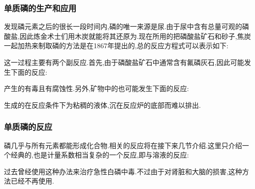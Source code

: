\documentclass{ctexart}
\begin{document}
\subsubsection{单质磷的生产和应用}
发现磷元素之后的很长一段时间内,磷的唯一来源是尿.由于尿中含有总量可观的磷酸盐,因此炼金术士们用木炭就能将其还原为.现在所用的把磷酸盐矿石和砂子,焦炭一起加热来制取磷的方法是在1867年提出的,总的反应方程式可以表示如下:
\begin{center}
\end{center}
这一过程主要有两个副反应.首先,由于磷酸盐矿石中通常含有氟磷灰石,因此可能发生下面的反应:
\begin{center}
\end{center}
产生的有毒且有腐蚀性.另外,矿物中的也可能发生下面的反应:
\begin{center}
\end{center}
生成的在反应条件下为粘稠的液体,沉在反应炉的底部而难以排出.
\subsubsection{单质磷的反应}
磷几乎与所有元素都能形成化合物.相关的反应将在接下来几节介绍.这里只介绍一个经典的,也是计量系数相当复杂的一个反应,即与溶液的反应:
\begin{center}
\end{center}
过去曾经使用这种办法来治疗急性白磷中毒.不过由于对肾脏和大脑的损害,这种方法已经不再使用.
\end{document}
